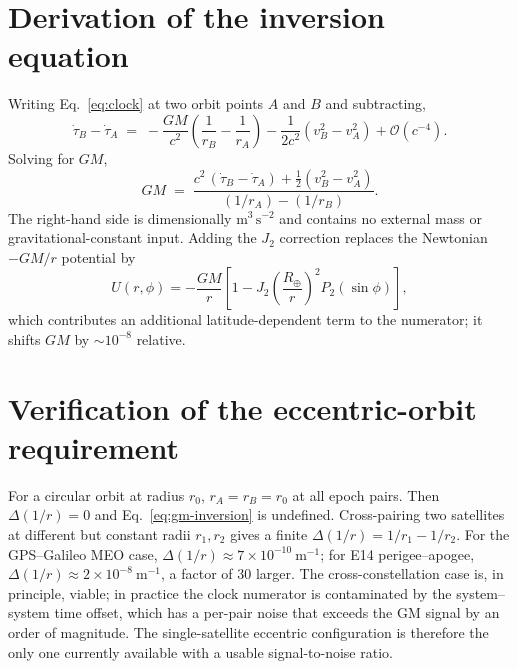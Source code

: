 \documentclass[11pt,a4paper]{article}
\begin{document}
\appendix

\section{Derivation of the inversion equation}
\label{app:derivation}

Writing Eq.~\eqref{eq:clock} at two orbit points $A$ and $B$ and subtracting,
\begin{equation}
    \dot\tau_B - \dot\tau_A \;=\; -\frac{GM}{c^2}\left(\frac{1}{r_B} - \frac{1}{r_A}\right) - \frac{1}{2c^2}(v_B^2 - v_A^2) + \mathcal{O}(c^{-4}).
\end{equation}
Solving for $GM$,
\begin{equation}
    GM \;=\; \frac{c^2\,(\dot\tau_B - \dot\tau_A) + \tfrac{1}{2}(v_B^2 - v_A^2)}{(1/r_A) - (1/r_B)}.
\end{equation}
The right-hand side is dimensionally $\mathrm{m^3\,s^{-2}}$ and contains no external mass or gravitational-constant input. Adding the $J_2$ correction replaces the Newtonian $-GM/r$ potential by
\begin{equation}
    U(r,\phi) = -\frac{GM}{r}\left[1 - J_2 \left(\frac{R_\oplus}{r}\right)^2 P_2(\sin\phi)\right],
\end{equation}
which contributes an additional latitude-dependent term to the numerator; it shifts $GM$ by $\sim 10^{-8}$ relative.

\section{Verification of the eccentric-orbit requirement}
\label{app:eccentric}

For a circular orbit at radius $r_0$, $r_A = r_B = r_0$ at all epoch pairs. Then $\Delta(1/r) = 0$ and Eq.~\eqref{eq:gm-inversion} is undefined. Cross-pairing two satellites at different but constant radii $r_1, r_2$ gives a finite $\Delta(1/r) = 1/r_1 - 1/r_2$. For the GPS--Galileo MEO case, $\Delta(1/r) \approx 7 \times 10^{-10}~\mathrm{m^{-1}}$; for E14 perigee--apogee, $\Delta(1/r) \approx 2 \times 10^{-8}~\mathrm{m^{-1}}$, a factor of 30 larger. The cross-constellation case is, in principle, viable; in practice the clock numerator is contaminated by the system--system time offset, which has a per-pair noise that exceeds the GM signal by an order of magnitude. The single-satellite eccentric configuration is therefore the only one currently available with a usable signal-to-noise ratio.
\end{document}
